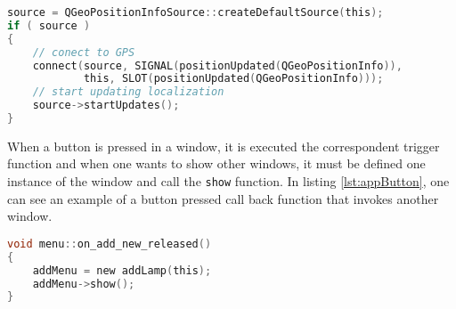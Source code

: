 \begin{lstlisting}[language=C, caption={Mobile Application: Obtain GPS coordinates.}, label={lst:appLocation}]
source = QGeoPositionInfoSource::createDefaultSource(this);
if ( source )
{
	// conect to GPS
	connect(source, SIGNAL(positionUpdated(QGeoPositionInfo)), 
			this, SLOT(positionUpdated(QGeoPositionInfo)));
	// start updating localization
	source->startUpdates();
}
\end{lstlisting}

When a button is pressed in a window, it is executed the correspondent trigger function and when one wants to show other windows, it must be defined one instance of the window and call the \verb|show| function. In listing \ref{lst:appButton}, one can see an example of a button pressed call back function that invokes another window.

\begin{lstlisting}[language=C, caption={Mobile Application: Button trigger function.}, label={lst:appButton}]
void menu::on_add_new_released()
{
	addMenu = new addLamp(this);
	addMenu->show();
}
\end{lstlisting}

%
%
